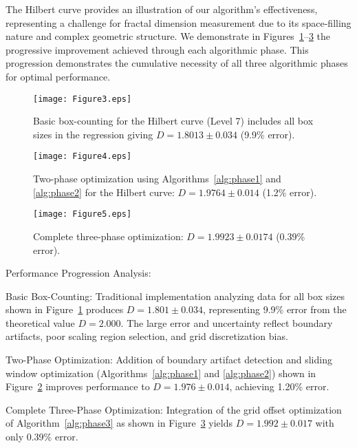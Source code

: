 \documentclass[preprint,12pt]{elsarticle}
\def\textbf#1{#1}%
\begin{document}
The Hilbert curve provides an illustration of our algorithm's effectiveness, representing a challenge for fractal dimension measurement due to its space-filling nature and complex geometric structure. We demonstrate in Figures~\ref{fig:hilbert_basic}--\ref{fig:hilbert_three_phase} the progressive improvement achieved through each algorithmic phase. This progression demonstrates the cumulative necessity of all three algorithmic phases for optimal performance.

\begin{figure}[tbp]
\centering
\texttt{[image: Figure3.eps]}
\caption{Basic box-counting for the Hilbert curve (Level 7) includes all box sizes in the regression giving $D = 1.8013 \pm 0.034$ (9.9\% error).}
\label{fig:hilbert_basic}
\end{figure}

\begin{figure}[H]
\centering
\texttt{[image: Figure4.eps]}
\caption{Two-phase optimization using Algorithms~\ref{alg:phase1} and \ref{alg:phase2} for the  Hilbert curve: $D = 1.9764 \pm 0.014$ (1.2\% error).}
\label{fig:hilbert_two_phase}
\end{figure}

\begin{figure}[H]
\centering
\texttt{[image: Figure5.eps]}
\caption{Complete three-phase optimization: $D = 1.9923 \pm 0.0174$ (0.39\% error).}
\label{fig:hilbert_three_phase}
\end{figure}

\textbf{Performance Progression Analysis}:

\textbf{Basic Box-Counting}: Traditional implementation analyzing data for all box sizes shown in Figure~\ref{fig:hilbert_basic} produces $D = 1.801 \pm 0.034$, representing 9.9\% error from the theoretical value $D = 2.000$. The large error and uncertainty reflect boundary artifacts, poor scaling region selection, and grid discretization bias.

\textbf{Two-Phase Optimization}: Addition of boundary artifact detection and sliding window optimization (Algorithms~\ref{alg:phase1} and \ref{alg:phase2}) shown in Figure~\ref{fig:hilbert_two_phase} improves performance to $D = 1.976 \pm 0.014$, achieving 1.20\% error.

\textbf{Complete Three-Phase Optimization}: Integration of the grid offset optimization of Algorithm~\ref{alg:phase3} as shown in Figure~\ref{fig:hilbert_three_phase} yields $D = 1.992 \pm 0.017$ with only 0.39\% error.
\end{document}
